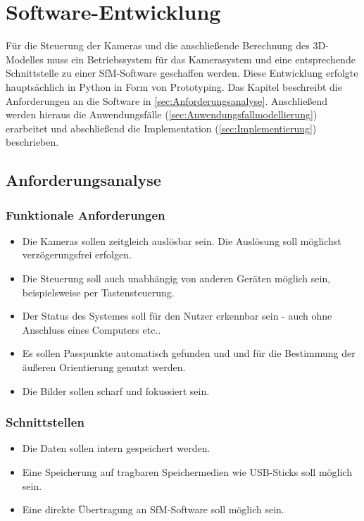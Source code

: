 \documentclass[./00PhotoBox.tex]{subfiles}
\begin{document}
\chapter{Software-Entwicklung}
Für die Steuerung der Kameras und die anschließende Berechnung des 3D-Modelles muss ein Betriebssystem für das Kamerasystem und eine entsprechende Schnittstelle zu einer SfM-Software geschaffen werden. Diese Entwicklung erfolgte hauptsächlich in Python in Form von Prototyping. Das Kapitel beschreibt die Anforderungen an die Software in \autoref{sec:Anforderungsanalyse}. Anschließend werden hieraus die Anwendungsfälle (\autoref{sec:Anwendungsfallmodellierung}) erarbeitet und abschließend die Implementation (\autoref{sec:Implementierung}) beschrieben.

\section{Anforderungsanalyse}
\label{sec:Anforderungsanalyse}

\subsection{Funktionale Anforderungen}
\begin{itemize}
    \item Die Kameras sollen zeitgleich auslösbar sein. Die Auslösung soll möglichst ver\-zögerungs\-frei erfolgen.
    \item Die Steuerung soll auch unabhängig von anderen Geräten möglich sein, beispielsweise per Tastensteuerung.
    \item Der Status des Systemes soll für den Nutzer erkennbar sein - auch ohne Anschluss eines Computers etc..
    \item Es sollen Passpunkte automatisch gefunden und und für die Bestimmung der äußeren Orientierung genutzt werden.
    \item Die Bilder sollen scharf und fokussiert sein.
\end{itemize}

\subsection{Schnittstellen}
\begin{itemize}
    \item Die Daten sollen intern gespeichert werden.
    \item Eine Speicherung auf tragbaren Speichermedien wie USB-Sticks soll möglich sein.
    \item Eine direkte Übertragung an SfM-Software soll möglich sein.
\end{itemize}
\end{document}
